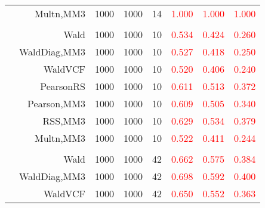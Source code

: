 \documentclass[
]{article}
\begin{document}
\begin{table}[H]
{\begin{tabular}[t]{lrrrrrrr}
\hspace{1em} & Multn,MM3 & 1000 & 1000 & 14 & \textcolor{red}{1.000} & \textcolor{red}{1.000} & \textcolor{red}{1.000}\\
\cmidrule{1-8}
\addlinespace[0.3em]
\multicolumn{8}{l}{\textbf{2F 10V}}\\
\hspace{1em} & Wald & 1000 & 1000 & 10 & \textcolor{red}{0.534} & \textcolor{red}{0.424} & \textcolor{red}{0.260}\\

\hspace{1em} & WaldDiag,MM3 & 1000 & 1000 & 10 & \textcolor{red}{0.527} & \textcolor{red}{0.418} & \textcolor{red}{0.250}\\

\hspace{1em} & WaldVCF & 1000 & 1000 & 10 & \textcolor{red}{0.520} & \textcolor{red}{0.406} & \textcolor{red}{0.240}\\

\hspace{1em} & PearsonRS & 1000 & 1000 & 10 & \textcolor{red}{0.611} & \textcolor{red}{0.513} & \textcolor{red}{0.372}\\

\hspace{1em} & Pearson,MM3 & 1000 & 1000 & 10 & \textcolor{red}{0.609} & \textcolor{red}{0.505} & \textcolor{red}{0.340}\\

\hspace{1em} & RSS,MM3 & 1000 & 1000 & 10 & \textcolor{red}{0.629} & \textcolor{red}{0.534} & \textcolor{red}{0.379}\\

\hspace{1em} & Multn,MM3 & 1000 & 1000 & 10 & \textcolor{red}{0.522} & \textcolor{red}{0.411} & \textcolor{red}{0.244}\\
\cmidrule{1-8}
\addlinespace[0.3em]
\multicolumn{8}{l}{\textbf{3F 15V}}\\
\hspace{1em} & Wald & 1000 & 1000 & 42 & \textcolor{red}{0.662} & \textcolor{red}{0.575} & \textcolor{red}{0.384}\\

\hspace{1em} & WaldDiag,MM3 & 1000 & 1000 & 42 & \textcolor{red}{0.698} & \textcolor{red}{0.592} & \textcolor{red}{0.400}\\

\hspace{1em} & WaldVCF & 1000 & 1000 & 42 & \textcolor{red}{0.650} & \textcolor{red}{0.552} & \textcolor{red}{0.363}\\


\end{tabular}}
\end{table}
\end{document}
